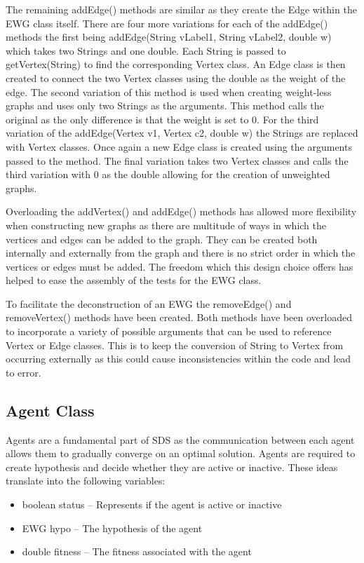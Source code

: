 \documentclass{AISB2008}
\begin{document}
{The remaining addEdge() methods are similar as they create the Edge within the EWG class itself. There are four more variations for each of the addEdge() methods the first being addEdge(String vLabel1, String vLabel2, double w) which takes two Strings and one double. Each String is passed to getVertex(String) to find the corresponding Vertex class. An Edge class is then created to connect the two Vertex classes using the double as the weight of the edge. The second variation of this method is used when creating weight-less graphs and uses only two Strings as the arguments. This method calls the original as the only difference is that the weight is set to 0. For the third variation of the addEdge(Vertex v1, Vertex c2, double w) the Strings are replaced with Vertex classes. Once again a new Edge class is created using the arguments passed to the method. The final variation takes two Vertex classes and calls the third variation with 0 as the double allowing for the creation of unweighted graphs.

Overloading the addVertex() and addEdge() methods has allowed more flexibility when constructing new graphs as there are multitude of ways in which the vertices and edges can be added to the graph. They can be created both internally and externally from the graph and there is no strict order in which the vertices or edges must be added. The freedom which this design choice offers has helped to ease the assembly of the tests for the EWG class.

To facilitate the deconstruction of an EWG the removeEdge() and removeVertex() methods have been created. Both methods have been overloaded to incorporate a variety of possible arguments that can be used to reference Vertex or Edge classes. This is to keep the conversion of String to Vertex from occurring externally as this could cause inconsistencies within the code and lead to error.


\subsection{Agent Class}

Agents are a fundamental part of SDS as the communication between each agent allows them to gradually converge on an optimal solution. Agents are required to create hypothesis and decide whether they are active or inactive. These ideas translate into the following variables:

\begin{itemize}
\item boolean status – Represents if the agent is active or inactive
\item EWG hypo – The hypothesis of the agent
\item double fitness – The fitness associated with the agent
\end{itemize}

}
\end{document}
